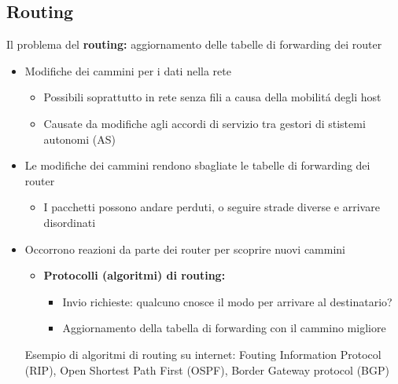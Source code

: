 \documentclass{article}
\begin{document}
\subsection{Routing}
Il problema del \textbf{routing:} aggiornamento delle tabelle di forwarding dei router
\begin{itemize}
    \item Modifiche dei cammini per i dati nella rete
    \begin{itemize}
        \item Possibili soprattutto in rete senza fili a causa della mobilit\'a degli host
        \item Causate da modifiche agli accordi di servizio tra gestori di stistemi autonomi (AS)
    \end{itemize}
    \item Le modifiche dei cammini rendono sbagliate le tabelle di forwarding dei router
    \begin{itemize}
        \item I pacchetti possono andare perduti, o seguire strade diverse e arrivare disordinati
    \end{itemize}
    \item Occorrono reazioni da parte dei router per scoprire nuovi cammini
    \begin{itemize}
        \item \textbf{Protocolli (algoritmi) di routing:}
        \begin{itemize}
            \item Invio richieste: qualcuno cnosce il modo per arrivare al destinatario?
            \item Aggiornamento della tabella di forwarding con il cammino migliore
        \end{itemize}
    \end{itemize}
    Esempio di algoritmi di routing su internet: Fouting Information Protocol (RIP), Open Shortest Path First (OSPF), Border Gateway protocol (BGP)
\end{itemize}
\end{document}

